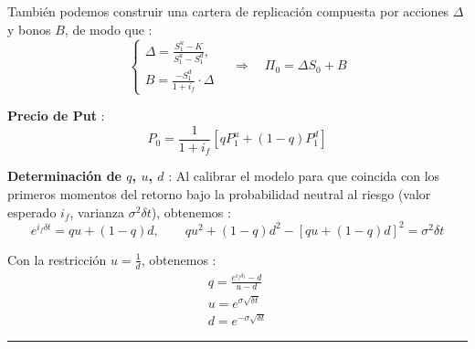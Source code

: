 \begin{f}
También podemos construir una cartera de replicación compuesta por acciones \(\Delta\) y bonos \(B\), de modo que :
\[
\begin{cases}
	\Delta = \frac{S_{1}^{u} - K}{S_{1}^{u} - S_{1}^{d}}, \\
	B = \frac{-S_{1}^{d}}{1+i_f} \cdot \Delta
\end{cases}
\quad \Rightarrow \quad \Pi_0 = \Delta S_0 + B
\]

\textbf{Precio de Put} :
\[
P_{0} = \frac{1}{1+i_f} \left[ q P_{1}^{u} + (1 - q) P_{1}^{d} \right]
\]

\textbf{Determinación de \(q\), \(u\), \(d\)} :  
Al calibrar el modelo para que coincida con los primeros momentos del retorno bajo la probabilidad neutral al riesgo (valor esperado \(i_f\), varianza \(\sigma^2 \delta t\)), obtenemos :
\[
e^{i_{f} \delta t} = q u + (1-q) d, \qquad q u^2 + (1-q) d^2 - [q u + (1-q) d]^2 = \sigma^2 \delta t
\]

Con la restricción \(u = \frac{1}{d}\), obtenemos :
\[
\begin{array}{l}
	q = \frac{e^{i_f \delta_t} - d}{u - d} \\
	u = e^{\sigma \sqrt{\delta t}} \\
	d = e^{-\sigma \sqrt{\delta t}}
\end{array}
\]

\end{f}
\hrule

